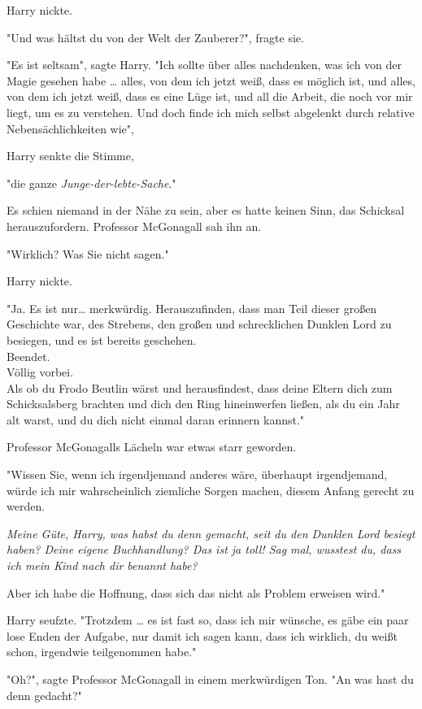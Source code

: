 {Harry nickte.

"Und was hältst du von der Welt der Zauberer?", fragte sie.

"Es ist seltsam", sagte Harry. "Ich sollte über alles nachdenken, was ich von der Magie gesehen habe … alles, von dem ich jetzt weiß, dass es möglich ist, und alles, von dem ich jetzt weiß, dass es eine Lüge ist, und all die Arbeit, die noch vor mir liegt, um es zu verstehen. Und doch finde ich mich selbst abgelenkt durch relative Nebensächlichkeiten wie",

Harry senkte die Stimme,

"die ganze \emph{Junge-der-lebte-Sache}."

Es schien niemand in der Nähe zu sein, aber es hatte keinen Sinn, das Schicksal herauszufordern. Professor McGonagall sah ihn an.

"Wirklich? Was Sie nicht sagen."

Harry nickte.

"Ja. Es ist nur… merkwürdig. Herauszufinden, dass man Teil dieser großen Geschichte war, des Strebens, den großen und schrecklichen Dunklen Lord zu besiegen, und es ist bereits geschehen.\\ Beendet.\\ Völlig vorbei.\\ Als ob du Frodo Beutlin wärst und herausfindest, dass deine Eltern dich zum Schicksalsberg brachten und dich den Ring hineinwerfen ließen, als du ein Jahr alt warst, und du dich nicht einmal daran erinnern kannst."

Professor McGonagalls Lächeln war etwas starr geworden.

"Wissen Sie, wenn ich irgendjemand anderes wäre, überhaupt irgendjemand, würde ich mir wahrscheinlich ziemliche Sorgen machen, diesem Anfang gerecht zu werden.

\emph{Meine Güte, Harry, was habst du denn gemacht, seit du den Dunklen Lord besiegt haben? Deine eigene Buchhandlung? Das ist ja toll! Sag mal, wusstest du, dass ich mein Kind nach dir benannt habe?}

Aber ich habe die Hoffnung, dass sich das nicht als Problem erweisen wird."

Harry seufzte. "Trotzdem … es ist fast so, dass ich mir wünsche, es gäbe ein paar lose Enden der Aufgabe, nur damit ich sagen kann, dass ich wirklich, du weißt schon, irgendwie teilgenommen habe."

"Oh?", sagte Professor McGonagall in einem merkwürdigen Ton. "An was hast du denn gedacht?"

}
